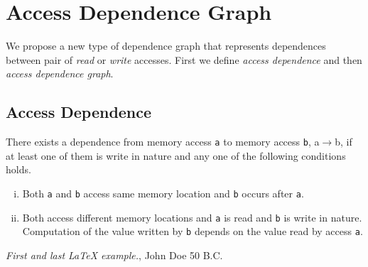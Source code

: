 \documentclass[a4paper,12pt]{article}
\begin{document}
\section{Access Dependence Graph}
We propose a new type of dependence graph that represents dependences between
pair of \emph{read} or \emph{write} accesses. First we
define \emph{access dependence} and then \emph{access dependence graph}.
\subsection{Access Dependence}
There exists a dependence from memory access {\tt a} to memory access {\tt b},
a$\to$b,
if at least one of them is write in nature and any one of the following conditions
holds. 
\begin{enumerate}[(i)]
	\item Both {\tt a} and {\tt b} access same memory location and {\tt b}
		occurs after {\tt a}.
	\item Both access different memory locations and {\tt a} is read and
		{\tt b} is write in nature. Computation of the
		value written by {\tt b} depends on the value read by 
		access {\tt a}.
\end{enumerate}
\begin{thebibliography}{9}
 \emph{First and last \LaTeX{} example.},
John Doe 50 B.C. 
\end{thebibliography}
\end{document}
